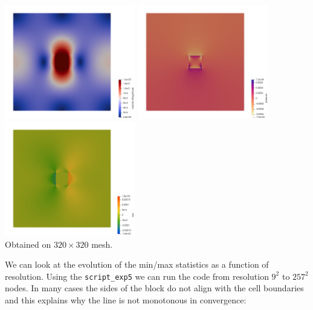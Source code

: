 \begin{center}
\includegraphics[width=5.7cm]{python_codes/fieldstone_158/results/exp5/vel}
\includegraphics[width=5.7cm]{python_codes/fieldstone_158/results/exp5/press}
\includegraphics[width=5.7cm]{python_codes/fieldstone_158/results/exp5/exy}\\
{\captionfont Obtained on $320 \times 320$ mesh.}
\end{center}

We can look at the evolution of the min/max statistics as a function of resolution.
Using the {\tt script\_exp5} we can run the code from resolution $9^2$ to $257^2$ 
nodes. In many cases the sides of the block do not align with the cell boundaries 
and this explains why the line is not monotonous in convergence:

